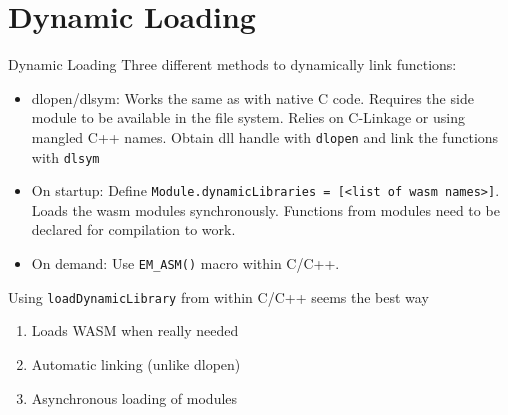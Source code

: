 \documentclass[10pt, a4paper]{beamer} %
\begin{document}
\section{Dynamic Loading}
\begin{frame}[allowframebreaks]{Dynamic Loading}
  Three different methods to dynamically link functions:

  \begin{itemize}
    \item dlopen/dlsym: Works the same as with native C code. Requires the side module to be available in the file system. Relies on C-Linkage or using mangled
    C++ names. Obtain dll handle with \texttt{dlopen} and link the functions with \texttt{dlsym}
    \item On startup: Define \texttt{Module.dynamicLibraries = [<list of wasm names>]}. Loads the wasm modules synchronously. Functions from modules need 
    to be declared for compilation to work.
    \item On demand: Use \texttt{EM\_ASM()} macro within C/C++.
  \end{itemize}
  \framebreak

    Using \texttt{loadDynamicLibrary} from within C/C++ seems the best way

    \begin{enumerate}
      \item Loads WASM when really needed
      \item Automatic linking (unlike dlopen)
      \item Asynchronous loading of modules
    \end{enumerate}
\end{frame}
\end{document}

